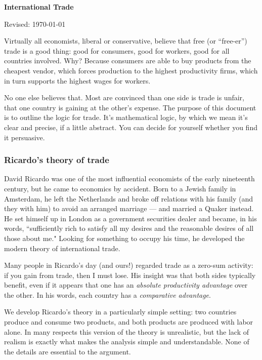\documentclass[letterpaper,12pt]{article}
\begin{document}
\thispagestyle{empty}%
\Head

\centerline{\large \bf International Trade}%
\centerline{Revised:  \today}

\bigskip
Virtually all economists, liberal or conservative, believe that
free (or ``free-er'') trade is a good thing:
good for consumers, good for workers,
good for all countries involved.
Why?  Because consumers are able to buy products
from the cheapest vendor,
which forces production to the highest productivity firms,
which in turn supports the highest wages for workers.

No one else believes that.
Most are convinced than one side is trade is unfair, that one country
is gaining at the other's expense.
The purpose of this document is to outline the logic for trade.
It's mathematical logic, by which we mean it's clear and precise,
if a little abstract.
You can decide for yourself whether you find it persuasive.


\subsubsection*{Ricardo's theory of trade}

David Ricardo was one of the most influential economists of the early
nineteenth century,
but he came to economics by accident.  Born to a
Jewish family in Amsterdam, he left the Netherlands and broke off
relations with his family (and they with him) to avoid an arranged
marriage --- and married a Quaker instead.  He set himself up in
London as a government securities dealer and became, in his words,
``sufficiently rich to satisfy all my desires and the reasonable
desires of all those about me."  Looking for something to occupy
his time, he developed the modern theory of international trade.

Many people in Ricardo's day (and ours!) regarded trade as a
zero-sum activity:  if you gain from trade, then I must lose.  His
insight was that both sides typically benefit, even if it appears
that one has an \textit{absolute productivity advantage} over the
other. In his words, each country has a \textit{comparative
advantage}.

We develop Ricardo's theory in a particularly simple setting:
two countries produce and consume two products, and both products
are produced with labor alone.  In many respects this version of
the theory is unrealistic, but the lack of realism is exactly what
makes the analysis simple and understandable.
None of the details are essential to the argument.
\end{document}
